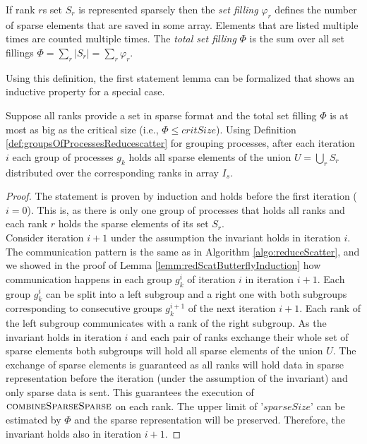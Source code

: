 \begin{definition}
	If rank $r$s set $S_r$ is represented sparsely then the \emph{set filling} $\varphi_r$ defines the number of sparse elements that are saved in some array. Elements that are listed multiple times are counted multiple times. The \emph{total set filling} $\Phi$ is the sum over all set fillings $\Phi = \sum_r |S_r| = \sum_r \varphi_r$.
\end{definition}
Using this definition, the first statement lemma can be formalized that shows an inductive property for a special case.
\begin{lemma}
	Suppose all ranks provide a set in sparse format and the total set filling $\Phi$ is at most as big as the critical size (i.e., $\Phi \leq critSize$). Using Definition \ref{def:groupsOfProcessesReducescatter} for grouping processes, after each iteration $i$ each group of processes $g_k$ holds all sparse elements of the union $U=\bigcup_r S_r$ distributed  over the corresponding ranks in array $I_s$.
\end{lemma}
\begin{proof}
	The statement is proven by induction and holds before the first iteration ($i=0$). This is, as there is only one group of processes that holds all ranks and each rank $r$ holds the sparse elements of its set $S_r$.\\
	Consider iteration $i+1$ under the assumption the invariant holds in iteration $i$. The communication pattern is the same as in Algorithm \ref{algo:reduceScatter}, and we showed in the proof of Lemma \ref{lemm:redScatButterflyInduction} how communication happens in each group $g_k^i$ of iteration $i$ in iteration $i+1$. Each group $g_k^i$ can be split into a left subgroup and a right one with both subgroups corresponding to consecutive groups $g_k^{i+1}$ of the next iteration $i+1$. Each rank of the left subgroup communicates with a rank of the right subgroup. As the invariant holds in iteration $i$ and each pair of ranks exchange their whole set of sparse elements both subgroups will hold all sparse elements of the union $U$. The exchange of sparse elements is guaranteed as all ranks will hold data in sparse representation before the iteration (under the assumption of the invariant) and only sparse data is sent. This guarantees the execution of $\Call{combineSparseSparse}{}$ on each rank. The upper limit of '$sparseSize$' can be estimated by $\Phi$ and the sparse representation will be preserved. Therefore, the invariant holds also in iteration $i+1$.
\end{proof}
